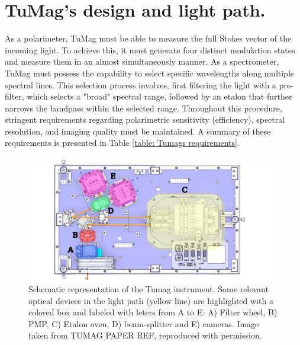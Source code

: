 \section{TuMag's design and light path.}

As a polarimeter, TuMag must be able to measure the full Stokes vector of the incoming light. To achieve this, it must generate four distinct modulation states and measure them in an almost simultaneously manner. As a spectrometer, TuMag must possess the capability to select specific wavelengths along multiple spectral lines. This selection process involves, first filtering the light with a pre-filter, which selects a "broad" spectral range, followed by an etalon that further narrows the bandpass within the selected range. Throughout this procedure, stringent requirements regarding polarimetric sensitivity (efficiency), spectral resolution, and imaging quality must be maintained. A summary of these requirements is presented in Table \ref{table: Tumags requirements}.

\begin{figure}[t]
    \includegraphics[width=\textwidth]{figures/TuMag/Scheme.pdf}
    \caption{Schematic representation of the Tumag instrument. Some relevant optical devices in the light path (yellow line) are highlighted with a colored box and labeled with leters from A to E: A) Filter wheel, B) PMP, C) Etalon oven, D) beam-splitter and E) cameras. Image taken from TUMAG PAPER REF, reproduced with permission.      
    \label{fig_tumag:scheme}}
\end{figure}

